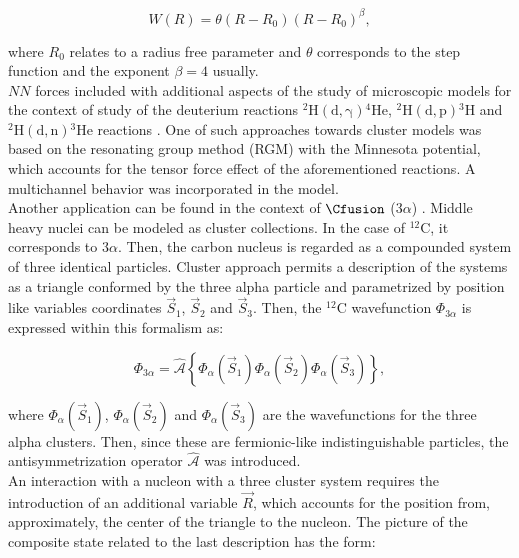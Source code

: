 \documentclass[openany]{book}
\begin{document}
\begin{equation}\label{eq:middleFusion_threeBody_resonances_complexAbsorption_potential}
	W(R) = \theta(R - R_0) (R - R_0)^{\beta},
\end{equation}

where $R_0$ relates to a radius free parameter and $\theta$ corresponds to the step function and the exponent $\beta = 4$ usually. \\

$NN$ forces included with additional aspects of the study of microscopic models for the context of study of the deuterium reactions $\mathrm{{}^{2}H(d, \gamma){}^{4}He}$, $\mathrm{{}^{2}H(d, p){}^{3}H}$ and $\mathrm{{}^{2}H(d, n){}^{3}He}$ reactions \cite{arai_aoyama_suzuki_descouvemont_baye_2013}. One of such approaches towards cluster models was based on the resonating group method (RGM) with the Minnesota potential, which accounts for the tensor force effect of the aforementioned reactions. A multichannel behavior was incorporated in the model. \\

Another application can be found in the context of  $\Cfusion$ (3$\alpha$) \cite{dufour_descouvemont_1997}. Middle heavy nuclei can be modeled as cluster collections. In the case of $\mathrm{{}^{12}C}$, it corresponds to $3 \alpha$. Then, the carbon nucleus is regarded as a compounded system of three identical particles. Cluster approach permits a description of the systems as a triangle conformed by the three alpha particle and parametrized by position like variables coordinates $\vec S_1 $, $\vec S_2$ and $\vec S_3$. Then, the $\mathrm{{}^{12}C}$ wavefunction $\Phi_{3\alpha}$ is expressed within this formalism as: 

\begin{equation}\label{eq:micro_multicluster_3alpha}
	\Phi_{3\alpha} = \hat {\mathcal{A}} \left\{ \Phi_\alpha (\vec S_1) \Phi_\alpha(\vec S_2) \Phi_\alpha(\vec S_3) \right\},
\end{equation}

where $\Phi_\alpha (\vec S_1)$,   $\Phi_\alpha (\vec S_2)$ and 
$\Phi_\alpha (\vec S_3)$ are the wavefunctions for the three alpha clusters. Then, since these are fermionic-like indistinguishable particles, the antisymmetrization operator  $\hat {\mathcal{A}} $ was introduced. \\

An interaction with a nucleon with a three cluster system requires the introduction of an additional variable $\vec R$, which accounts for the position from, approximately, the center of the triangle to the nucleon. The picture of the composite state related to the last description has the form: 
\end{document}
